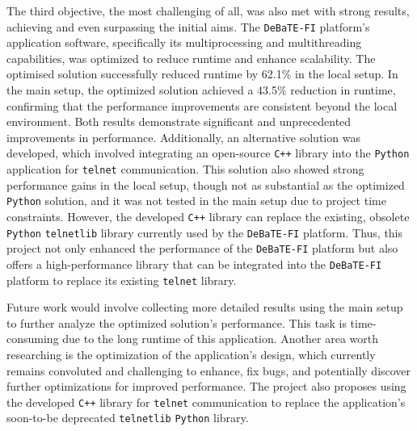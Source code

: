 The third objective, the most challenging of all, was also met with strong results, achieving and even surpassing the initial aims. The \texttt{DeBaTE-FI} platform's application software, specifically its multiprocessing and multithreading capabilities, was optimized to reduce runtime and enhance scalability. The optimised solution successfully reduced runtime by 62.1\% in the local setup. In the main setup, the optimized solution achieved a 43.5\% reduction in runtime, confirming that the performance improvements are consistent beyond the local environment. Both results demonstrate significant and unprecedented improvements in performance. Additionally, an alternative solution was developed, which involved integrating an open-source \texttt{C++} library into the \texttt{Python} application for \texttt{telnet} communication. This solution also showed strong performance gains in the local setup, though not as substantial as the optimized \texttt{Python} solution, and it was not tested in the main setup due to project time constraints. However, the developed \texttt{C++} library can replace the existing, obsolete \texttt{Python} \texttt{telnetlib} library currently used by the \texttt{DeBaTE-FI} platform. Thus, this project not only enhanced the performance of the \texttt{DeBaTE-FI} platform but also offers a high-performance library that can be integrated into the \texttt{DeBaTE-FI} platform to replace its existing \texttt{telnet} library.

Future work would involve collecting more detailed results using the main setup to further analyze the optimized solution's performance. This task is time-consuming due to the long runtime of this application. Another area worth researching is the optimization of the application's design, which currently remains convoluted and challenging to enhance, fix bugs, and potentially discover further optimizations for improved performance. The project also proposes using the developed \texttt{C++} library for \texttt{telnet} communication to replace the application's soon-to-be deprecated \texttt{telnetlib} \texttt{Python} library.

